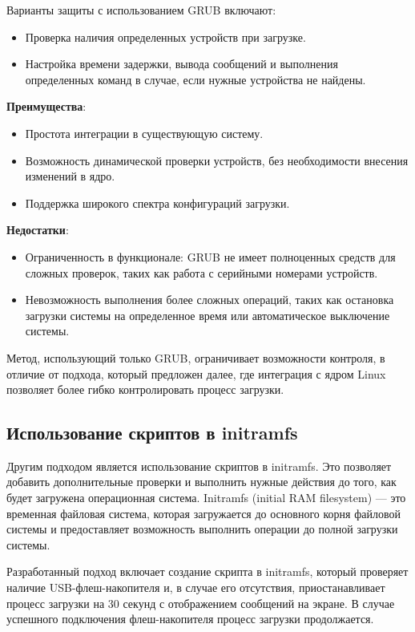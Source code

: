 \documentclass[12pt]{article}
\begin{document}
Варианты защиты с использованием GRUB включают:
\begin{itemize}
    \item Проверка наличия определенных устройств при загрузке.
    \item Настройка времени задержки, вывода сообщений и выполнения определенных команд в случае, если нужные устройства не найдены.
\end{itemize}

\textbf{Преимущества}:
\begin{itemize}
    \item Простота интеграции в существующую систему.
    \item Возможность динамической проверки устройств, без необходимости внесения изменений в ядро.
    \item Поддержка широкого спектра конфигураций загрузки.
\end{itemize}

\textbf{Недостатки}:
\begin{itemize}
    \item Ограниченность в функционале: GRUB не имеет полноценных средств для сложных проверок, таких как работа с серийными номерами устройств.
    \item Невозможность выполнения более сложных операций, таких как остановка загрузки системы на определенное время или автоматическое выключение системы.
\end{itemize}

Метод, использующий только GRUB, ограничивает возможности контроля, в отличие от подхода, который предложен далее, где интеграция с ядром Linux позволяет более гибко контролировать процесс загрузки.

\subsection*{Использование скриптов в initramfs}

Другим подходом является использование скриптов в initramfs. Это позволяет добавить дополнительные проверки и выполнить нужные действия до того, как будет загружена операционная система. Initramfs (initial RAM filesystem) — это временная файловая система, которая загружается до основного корня файловой системы и предоставляет возможность выполнить операции до полной загрузки системы.

Разработанный подход включает создание скрипта в initramfs, который проверяет наличие USB-флеш-накопителя и, в случае его отсутствия, приостанавливает процесс загрузки на 30 секунд с отображением сообщений на экране. В случае успешного подключения флеш-накопителя процесс загрузки продолжается.
\end{document}
